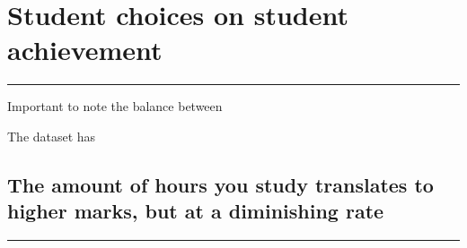 \documentclass[
]{article}
\begin{document}
\hypertarget{student-choices-on-student-achievement}{%
\section{Student choices on student
achievement}\label{student-choices-on-student-achievement}}

\begin{center}\rule{0.5\linewidth}{0.5pt}\end{center}

Important to note the balance between

The dataset has

\hypertarget{the-amount-of-hours-you-study-translates-to-higher-marks-but-at-a-diminishing-rate}{%
\subsection{The amount of hours you study translates to higher marks,
but at a diminishing
rate}\label{the-amount-of-hours-you-study-translates-to-higher-marks-but-at-a-diminishing-rate}}

\begin{center}\rule{0.5\linewidth}{0.5pt}\end{center}
\end{document}
